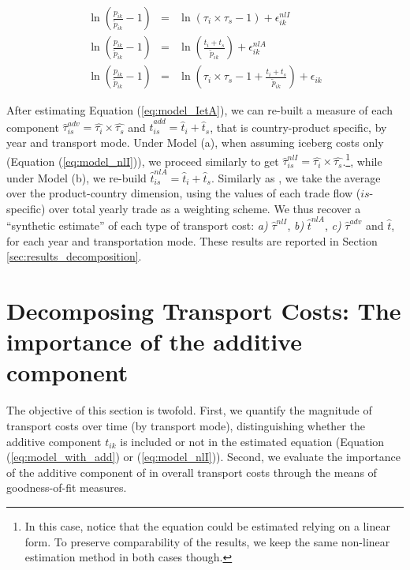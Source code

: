 \documentclass[a4paper,11pt]{article}
\begin{document}
\begin{eqnarray}
\ln\left(\frac{p_{ik}}{\widetilde{p}_{ik}}-1 \right)&=& \ln \left(\tau_{i}\times\tau_{s}-1 \right) + \epsilon^{nlI}_{ik} \label{eq:model_nlI} \\
\ln\left(\frac{p_{ik}}{\widetilde{p}_{ik}}-1 \right)&=& \ln \left(\frac{t_{i} + t_{s}}{\widetilde{p}_{ik}}\right) + \epsilon^{nlA}_{ik} \label{eq:model_nlA} \\
\ln\left(\frac{p_{ik}}{\widetilde{p}_{ik}}-1 \right)&=& \ln \left(\tau_{i} \times \tau_{s}-1 +\frac{t_{i} + t_{s}}{\widetilde{p}_{ik}}\right) + \epsilon_{ik} \label{eq:model_IetA}
\end{eqnarray}

After estimating Equation (\ref{eq:model_IetA}), we can re-built a measure of each component $\widehat{\tau}^{adv}_{is} = \widehat{\tau_{i}} \times \widehat{\tau_{s}}$ and $\widehat{t}^{add}_{is} = \widehat{t}_{i} + \widehat{t}_{s}$, that is country-product specific, by year and transport mode. Under Model (a), when assuming iceberg costs only (Equation (\ref{eq:model_nlI})), we proceed similarly to get $\widehat{\tau}^{nlI}_{is} = \widehat{\tau_{i}} \times \widehat{\tau_{s}}$.\footnote{In this case, notice that the equation could be estimated relying on a linear form. To preserve comparability of the results, we keep the same non-linear estimation method in both cases though.}, while under Model (b), we re-build $\widehat{t}^{nlA}_{is} = \widehat{t}_{i} + \widehat{t}_{s}$. Similarly as \citet{Irrazabal_2015}, we take the average over the product-country dimension, using the values of each trade flow ($is$-specific) over total yearly trade as a weighting scheme. We thus recover a ``synthetic estimate'' of each type of transport cost: \textit{a)} $\widehat{\tau}^{nlI}$, \textit{b)} $\widehat{t}^{nlA}$, \textit{c)} $\widehat{\tau}^{adv}$ and $\widehat{t}$, for each year and transportation mode. These results are reported in Section \ref{sec:results_decomposition}.


\section{Decomposing Transport Costs: The importance of the additive component \label{sec:results_decomposition}}

The objective of this section is twofold. First, we quantify the magnitude of transport costs over time (by transport mode), distinguishing whether the additive component $t_{ik}$ is included or not in the estimated equation (Equation (\ref{eq:model_with_add}) or (\ref{eq:model_nlI})). Second, we evaluate the importance of the additive component of in overall transport costs through the means of goodness-of-fit measures.
\end{document}
